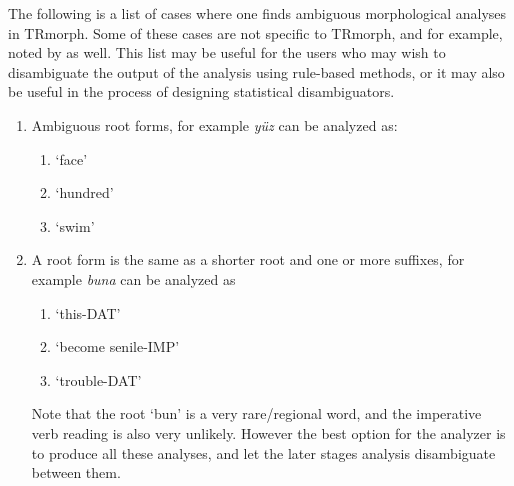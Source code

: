 \documentclass[twocolumn]{article}
\begin{document}
The following is a list of cases where one finds ambiguous
morphological analyses in TRmorph. Some of these cases are not
specific to TRmorph, and for example, noted by \cite{oflazer1997} as
well. This list may be useful for the users who may wish to
disambiguate the output of the analysis using rule-based methods, or
it may also be useful in the process of designing statistical
disambiguators.

\begin{enumerate}
\item Ambiguous root forms, for example \emph{yüz} can be analyzed as:
    \begin{enumerate}
        \item {} `face'
        \item {} `hundred'
        \item {} `swim'
    \end{enumerate}
\item\label{itm:buna} A root form is the same as a shorter root and one or more
suffixes, for example \emph{buna} can be analyzed as
    \begin{enumerate}
        \item {} `this-DAT'
        \item {} `become senile-IMP'
        \item {}   `trouble-DAT'
    \end{enumerate}
Note that the root `bun' is a very rare/regional word, and the imperative
verb reading is also very unlikely. However the best option
for the analyzer is to produce all these analyses, and let the later
stages analysis disambiguate between them.


\end{enumerate}
\end{document}
